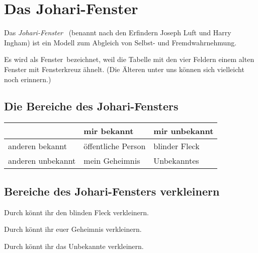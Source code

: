 \section{Das Johari-Fenster}
\label{johari-fenster}

Das \emph{Johari-Fenster}~\cite{johari-window, gruppendnamik-einfuehrung} (benannt nach den Erfindern Joseph Luft und Harry Ingham) ist ein Modell zum Abgleich von Selbst- und Fremdwahrnehmung.

Es wird als \glqq Fenster\grqq\ bezeichnet, weil die Tabelle mit den vier Feldern einem alten Fenster mit Fensterkreuz ähnelt. (Die Älteren unter uns können sich vielleicht noch erinnern.)

\subsection{Die Bereiche des Johari-Fensters}

\renewcommand{\arraystretch}{2.0}
\begin{tabular}{p{10em}|p{10em}|p{7em}|}
& mir bekannt \cellcolor{lightgray}  & mir unbekannt \cellcolor{lightgray}
\\ \hline

anderen bekannt \cellcolor{lightgray} & öffentliche Person & blinder Fleck
\\ \hline

anderen unbekannt \cellcolor{lightgray} & mein Geheimnis & Unbekanntes
\\ \hline
\end{tabular}
\renewcommand{\arraystretch}{1.0}


\subsection{Bereiche des Johari-Fensters verkleinern}

Durch  könnt ihr den blinden Fleck verkleinern.

Durch  könnt ihr euer Geheimnis verkleinern.

Durch  könnt ihr das Unbekannte verkleinern.
